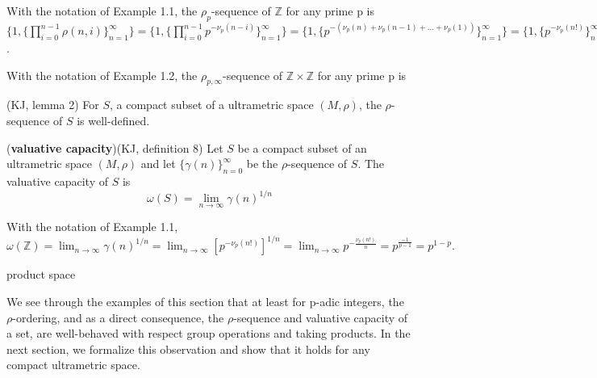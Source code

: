 \begin{example}
	With the notation of Example 1.1, the $\rho_p$-sequence of $\mathbb{Z}$ for any prime p is $\{1, \{\prod_{i=0}^{n-1} \rho(n,i)\}_{n=1}^{\infty}\}	= \{1, \{\prod_{i=0}^{n-1} p^{-\nu_p(n-i)}\}_{n=1}^{\infty}\}= \{1, \{p^{-(\nu_p(n) + \nu_p(n-1) +...+ \nu_p(1))}\}_{n=1}^{\infty}\}= \{1, \{p^{-\nu_p(n!)}\}_{n=1}^{\infty}\}$.
\end{example}	

\begin{example}
	With the notation of Example 1.2, the $\rho_{p, \infty}$-sequence of $\mathbb{Z} \times \mathbb{Z}$ for any prime p is ${}$
\end{example}	


\begin{proposition}
	(KJ, lemma 2) For $S$, a compact subset of a ultrametric space $(M, \rho)$, the $\rho$-sequence of $S$ is well-defined.
\end{proposition}

\begin{definition}
	(\textbf{valuative capacity})(KJ, definition 8) Let $S$ be a compact subset of an ultrametric space $(M, \rho)$ and let $\{\gamma(n)\}_{n=0}^{\infty}$ be the $\rho$-sequence of $S$. The valuative capacity of $S$ is $$\omega(S) = \lim_{n\to\infty} \gamma(n)^{1/n}$$
\end{definition}

\begin{example}
	With the notation of Example 1.1, $\omega(\mathbb{Z}) =\lim_{n\to\infty} \gamma(n)^{1/n} = \lim_{n\to\infty} [p^{-\nu_p(n!)}]^{1/n} = \lim_{n\to\infty} p^{-\frac{\nu_p(n!)}{n}} = p^{\frac{-1}{p-1}} = p^{1-p}.$ 
\end{example}

\begin{example}
	product space
\end{example}


\noindent We see through the examples of this section that at least for p-adic integers, the $\rho$-ordering, and as a direct consequence, the $\rho$-sequence and valuative capacity of a set, are well-behaved with respect group operations and taking products. In the next section, we formalize this observation and show that it holds for any compact ultrametric space.